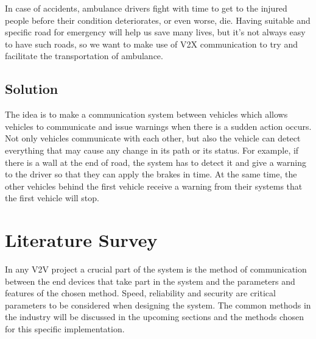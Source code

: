 In case of accidents, ambulance drivers fight with time to get to the injured people before their condition deteriorates, or even worse, die. Having suitable and specific road for emergency will help us save many lives, but it’s not always easy to have such roads, so we want to make use of V2X communication to try and facilitate the transportation of ambulance.
\subsection{Solution}
The idea is to make a communication system between vehicles which allows vehicles to communicate and issue warnings when there is a sudden action occurs. Not only vehicles communicate with each other, but also the vehicle can detect everything that may cause any change in its path or its status. \newline
For example, if there is a wall at the end of road, the system has to detect it and give a warning to the driver so that they can apply the brakes in time. At the same time, the other vehicles behind the first vehicle receive a warning from their systems that the first vehicle will stop.

\section{Literature Survey}
In any V2V project a crucial part of the system is the method of communication between the end devices that take part in the system and the parameters and features of the chosen method. Speed, reliability and security are critical parameters to be considered when designing the system. The common methods in the industry will be discussed in the upcoming sections and the methods chosen for this specific implementation.

